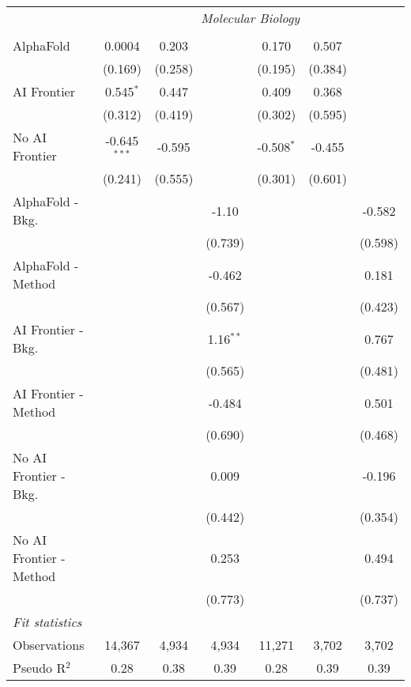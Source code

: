 \begin{tabular}{lcccccc}
 & \multicolumn{6}{c}{\textit{Molecular Biology}} \\ \\
   AlphaFold               & 0.0004         & 0.203   &             & 0.170        & 0.507   &   \\   
                           & (0.169)        & (0.258) &             & (0.195)      & (0.384) &   \\   
   AI Frontier             & 0.545$^{*}$    & 0.447   &             & 0.409        & 0.368   &   \\   
                           & (0.312)        & (0.419) &             & (0.302)      & (0.595) &   \\   
   No AI Frontier          & -0.645$^{***}$ & -0.595  &             & -0.508$^{*}$ & -0.455  &   \\   
                           & (0.241)        & (0.555) &             & (0.301)      & (0.601) &   \\   
   AlphaFold - Bkg.        &                &         & -1.10       &              &         & -0.582\\   
                           &                &         & (0.739)     &              &         & (0.598)\\   
   AlphaFold - Method      &                &         & -0.462      &              &         & 0.181\\   
                           &                &         & (0.567)     &              &         & (0.423)\\   
   AI Frontier - Bkg.      &                &         & 1.16$^{**}$ &              &         & 0.767\\   
                           &                &         & (0.565)     &              &         & (0.481)\\   
   AI Frontier - Method    &                &         & -0.484      &              &         & 0.501\\   
                           &                &         & (0.690)     &              &         & (0.468)\\   
   No AI Frontier - Bkg.   &                &         & 0.009       &              &         & -0.196\\   
                           &                &         & (0.442)     &              &         & (0.354)\\   
   No AI Frontier - Method &                &         & 0.253       &              &         & 0.494\\   
                           &                &         & (0.773)     &              &         & (0.737)\\   
   \midrule
   \emph{Fit statistics}\\
   Observations            & 14,367         & 4,934   & 4,934       & 11,271       & 3,702   & 3,702\\  
   Pseudo R$^2$            & 0.28           & 0.38    & 0.39        & 0.28         & 0.39    & 0.39\\  
   

\end{tabular}

